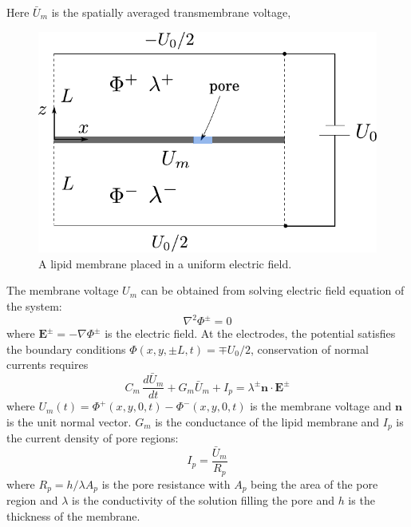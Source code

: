\documentclass[english,12pt]{article}
\begin{document}
 Here $\bar{U}_{m}$ is the spatially averaged transmembrane voltage, 
\begin{figure}[H]
	\centering
	\includegraphics[scale=0.75]{pics/model0.pdf}
	\caption{A lipid membrane placed in a uniform electric field.}
\end{figure}
The membrane voltage $U_m$ can be obtained from solving electric field equation of the system:
\begin{equation}
	\nabla^{2}\Phi^{\pm}=0
\end{equation}
where $\mathbf{E}^{\pm}=-\nabla\Phi^{\pm}$ is the electric field. At the electrodes, the potential satisfies the boundary conditions $\Phi(x,y,\pm L,t)=\mp U_0/2$, conservation of normal currents requires
\begin{equation}
	C_m\,\frac{d\bar{U}_m}{dt}+G_m\bar{U}_{m} +I_{p}=\lambda^{\pm}\mathbf{n}\cdot\mathbf{E}^{\pm}
\end{equation}
where $U_m(t)=\Phi^{+}(x,y,0,t)-\Phi^{-}(x,y,0,t)$ is the membrane voltage and $\mathbf{n}$ is the unit normal vector. $G_m$ is the conductance of the lipid membrane and $I_p$ is the current density of pore regions:
\begin{equation}
I_p=\frac{\bar{U}_m}{R_{p}}
\label{Um}
\end{equation}
where $R_p=h/\lambda A_p$ is the pore resistance with $A_p$ being the area of the pore region and $\lambda$ is the conductivity of the solution filling the pore and $h$ is the thickness of the membrane.
\end{document}
